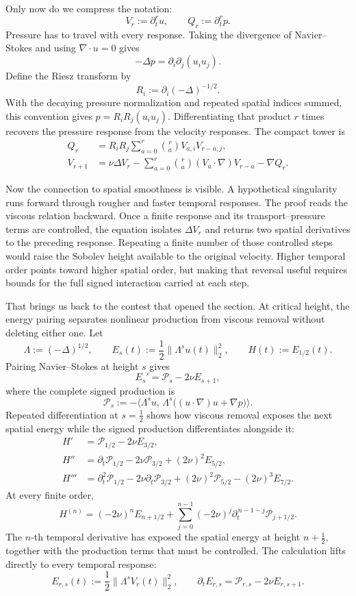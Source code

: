 Only now do we compress the notation:
\[
V_r:=\partial_t^ru,
\qquad
Q_r:=\partial_t^rp.
\]
Pressure has to travel with every response.  Taking the divergence of
Navier--Stokes and using \(\nabla\!\cdot u=0\) gives
\[
-\Delta p=\partial_i\partial_j(u_i u_j).
\]
Define the Riesz transform by
\[
R_i:=\partial_i(-\Delta)^{-1/2}.
\]
With the decaying pressure normalization and repeated spatial indices summed,
this convention gives
\(p=R_iR_j(u_i u_j)\).  Differentiating that product \(r\) times recovers
the pressure response from the velocity responses.  The compact tower is
\[
\begin{aligned}
Q_r
&=R_iR_j\sum_{a=0}^{r}\binom ra V_{a,i}V_{r-a,j},\\
V_{r+1}
&=\nu\Delta V_r
  -\sum_{a=0}^{r}\binom ra(V_a\!\cdot\nabla)V_{r-a}
  -\nabla Q_r.
\end{aligned}
\]

Now the connection to spatial smoothness is visible.  A hypothetical
singularity runs forward through rougher and faster temporal responses.  The
proof reads the viscous relation backward.  Once a finite response and its
transport--pressure terms are controlled, the equation isolates
\(\Delta V_r\) and returns two spatial derivatives to the preceding response.
Repeating a finite number of those controlled steps would raise the Sobolev
height available to the original velocity.  Higher temporal order points toward
higher spatial order, but making that reversal useful requires bounds for the
full signed interaction carried at each step.

That brings us back to the contest that opened the section.  At critical
height, the energy pairing separates nonlinear production from viscous removal
without deleting either one.  Let
\[
\Lambda:=(-\Delta)^{1/2},
\qquad
E_s(t):=\frac12\|\Lambda^su(t)\|_2^2,
\qquad
H(t):=E_{1/2}(t).
\]
Pairing Navier--Stokes at height \(s\) gives
\[
E_s'=\mathcal P_s-2\nu E_{s+1},
\]
where the complete signed production is
\[
\mathcal P_s
:=-\bigl\langle
\Lambda^su,\,
\Lambda^s\bigl((u\!\cdot\nabla)u+\nabla p\bigr)
\bigr\rangle.
\]
Repeated differentiation at \(s=\tfrac12\) shows how viscous removal exposes
the next spatial energy while the signed production differentiates alongside
it:
\[
\begin{aligned}
H'
&=\mathcal P_{1/2}-2\nu E_{3/2},\\
H''
&=\partial_t\mathcal P_{1/2}
  -2\nu\mathcal P_{3/2}
  +(2\nu)^2E_{5/2},\\
H'''
&=\partial_t^2\mathcal P_{1/2}
  -2\nu\partial_t\mathcal P_{3/2}
  +(2\nu)^2\mathcal P_{5/2}
  -(2\nu)^3E_{7/2}.
\end{aligned}
\]
At every finite order,
\[
H^{(n)}
=(-2\nu)^nE_{n+1/2}
+\sum_{j=0}^{n-1}(-2\nu)^j
 \partial_t^{\,n-1-j}\mathcal P_{j+1/2}.
\]
The \(n\)-th temporal derivative has exposed the spatial energy at height
\(n+\tfrac12\), together with the production terms that must be controlled.
The calculation lifts directly to every temporal response:
\[
E_{r,s}(t):=\frac12\|\Lambda^sV_r(t)\|_2^2,
\qquad
\partial_tE_{r,s}
=\mathcal P_{r,s}-2\nu E_{r,s+1}.
\]

